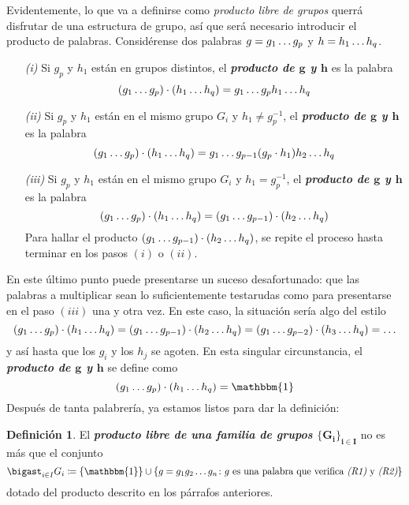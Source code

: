 \documentclass[11pt]{report}
\newenvironment{cdefinition} %
  {\begin{mdframed}[innertopmargin = 0pt,
                    innerbottommargin = 7.5pt,
                    backgroundcolor = lightgray!10,
                    linewidth = 1pt,
                    shadow = true,
                    shadowsize = 5pt,
                    roundcorner = 0pt,
                    skipabove = 0pt]
    \begin{definition}}
  {\end{definition}\end{mdframed}}
\theoremstyle{definition}
\newtheorem{definition}{Definición}[chapter]
\theoremstyle{definition}
\theoremstyle{remark}
\begin{document}
Evidentemente, lo que va a definirse como \textit{producto libre de grupos} querrá disfrutar de una estructura de grupo, así que será necesario introducir el producto de palabras. Considérense dos palabras $g = g_1\mathellipsis g_p$ y $h = h_1\mathellipsis h_q$.
\begin{itemize}
    \item[\textit{(i)}] Si $g_p$ y $h_1$ están en grupos distintos, el \textbf{\textit{producto de $\bm{g}$ y $\bm{h}$}} es la palabra
    \[(g_1\mathellipsis g_p) \cdot (h_1 \mathellipsis h_q) = g_1\mathellipsis g_p h_1 \mathellipsis h_q\]
    \item[\textit{(ii)}] Si $g_p$ y $h_1$ están en el mismo grupo $G_i$ y $h_1 \neq g_p^{-1}$, el \textbf{\textit{producto de $\bm{g}$ y $\bm{h}$}} es la palabra
    \[(g_1\mathellipsis g_p) \cdot (h_1 \mathellipsis h_q) = g_1\mathellipsis g_{p-1}(g_p \cdot h_1)h_2 \mathellipsis h_q\]
    \item[\textit{(iii)}] Si $g_p$ y $h_1$ están en el mismo grupo $G_i$ y $h_1 = g_p^{-1}$, el \textbf{\textit{producto de $\bm{g}$ y $\bm{h}$}} es la palabra
    \[(g_1 \mathellipsis g_p) \cdot (h_1 \mathellipsis h_q) = (g_1 \mathellipsis g_{p-1}) \cdot (h_2 \mathellipsis h_q)\]
    Para hallar el producto $(g_1 \mathellipsis g_{p-1}) \cdot (h_2 \mathellipsis h_q)$, se repite el proceso hasta terminar en los pasos $(i)$ o $(ii)$. 
\end{itemize}

En este último punto puede presentarse un suceso desafortunado: que las palabras a multiplicar sean lo suficientemente testarudas como para presentarse en el paso $(iii)$ una y otra vez. En este caso, la situación sería algo del estilo
\[(g_1 \mathellipsis g_p) \cdot (h_1 \mathellipsis h_q) = (g_1 \mathellipsis g_{p-1}) \cdot (h_2 \mathellipsis h_q) = (g_1 \mathellipsis g_{p-2}) \cdot (h_3 \mathellipsis h_q) = \mathellipsis\]
y así hasta que los $g_i$ y los $h_j$ se agoten. En esta singular circunstancia, el \textbf{\textit{producto de $\bm{g}$ y $\bm{h}$}} se define como
\[(g_1 \mathellipsis g_p) \cdot (h_1 \mathellipsis h_q) = \mathbbm{1}\]
Después de tanta palabrería, ya estamos listos para dar la definición:

\hfill

\begin{cdefinition}
El \textbf{\textit{producto libre de una familia de grupos $\bm{\{G_i\}_{i \in I}}$}} no es más que el conjunto
\[\bigast_{i \in I} G_i \coloneqq \{\mathbbm{1}\} \cup \{g = g_1g_2\mathellipsis g_n \colon g\text{ es una palabra que verifica }\textit{(R1)} \text{ y } \textit{(R2)}\}\]
dotado del producto descrito en los párrafos anteriores.
\end{cdefinition}
\end{document}
